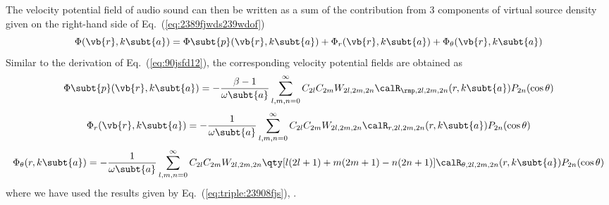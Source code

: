 The velocity potential field of audio sound can then be written as a sum of the contribution from 3 components of virtual source density given on the right-hand side of Eq.~(\ref{eq:2389fjwds239wdof})
\begin{equation}
    \Phi(\vb{r},k\subt{a})
    = \Phi\subt{p}(\vb{r}, k\subt{a})
    + \Phi_r(\vb{r}, k\subt{a})
    + \Phi_\theta(\vb{r},k\subt{a})
    \label{eq:cwe_potential_components}
\end{equation}
Similar to the derivation of Eq.~(\ref{eq:90jsfd12}), the corresponding velocity potential fields are obtained as
\begin{equation}
    \Phi\subt{p}(\vb{r},k\subt{a})
    = 
    -\frac{\beta-1}{\omega\subt{a}}
    \sum_{l,m,n=0}^\infty
    C_{2l}C_{2m}W_{2l,2m,2n}
    \calR_{\rmp, 2l, 2m,2n}(r,k\subt{a})
    P_{2n}(\cos\theta)
    \label{eq:cwe_potential_p}
\end{equation}
\begin{equation}
    \Phi_r(\vb{r}, k\subt{a})
    = -\frac{1}{\omega\subt{a}}
    \sum_{l,m,n=0}^\infty
    C_{2l}C_{2m}W_{2l,2m,2n}
    \calR_{r,2l,2m,2n}(r, k\subt{a})P_{2n}(\cos\theta)
    \label{eq:cwe_potential_r}
\end{equation}
\begin{dmath}
    \Phi_\theta(r,k\subt{a})
    = -\frac{1}{\omega\subt{a}}
    \sum_{l,m,n=0}^\infty
    C_{2l}C_{2m}
    W_{2l,2m,2n}
    \qty[l(2l+1)+m(2m+1)-n(2n+1)]
    \calR_{\theta,2l,2m,2n}(r, k\subt{a})
    P_{2n}(\cos\theta)
    \label{eq:cwe_potential_theta}
\end{dmath}
where we have used the results given by Eq.~(\ref{eq:triple:23908fjs}), .

